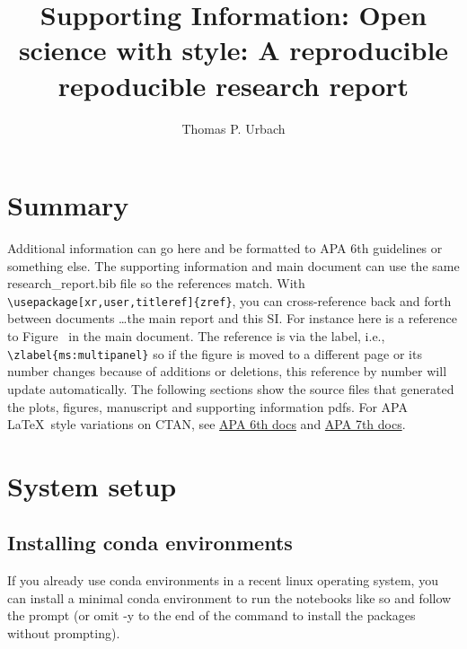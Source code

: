 \documentclass[helv,letter,doc,natbib,11pt]{apa6}  %
\title{Supporting Information: Open science with style: A reproducible repoducible research report}
\author{Thomas P. Urbach}
\affiliation{Kutas Lab \\ Cognitive Science Department \\ University of California, San Diego}
\begin{document}
\maketitle

\tableofcontents

\section{Summary}

Additional information can go here and be formatted to APA 6th
guidelines or something else. The supporting information and main
document can use the same research\_report.bib file so the references
match. With {\tt \textbackslash usepackage[xr,user,titleref]\{zref\}},
you can cross-reference back and forth between documents \ldots the
main report and this SI. For instance here is a reference to
Figure~ in the main document. The reference is via the
label, i.e., {\tt \textbackslash zlabel\{ms:multipanel\}} so if the figure
is moved to a different page or its number changes because of
additions or deletions, this reference by number will update
automatically. The following sections show the source files that
generated the plots, figures, manuscript and supporting information pdfs.
For APA \LaTeX \ style variations on CTAN, see
\href{http://ctan.math.utah.edu/ctan/tex-archive/macros/latex/contrib/biblatex-contrib/biblatex-apa6/biblatex-apa6.pdf}{APA 6th docs} and
\href{http://ctan.math.washington.edu/tex-archive/macros/latex/contrib/apa7/apa7.pdf}{APA 7th docs}.

% 
% 
% 
% 
% 



\section{System setup}

\subsection{Installing conda environments}

If you already use conda environments in a recent linux operating
system, you can install a minimal conda environment to run the
notebooks like so and follow the prompt (or omit -y to the end of the
command to install the packages without prompting).
\end{document}
